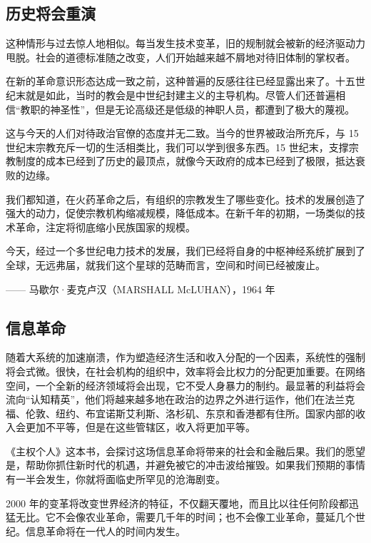 \subsection{历史将会重演}
这种情形与过去惊人地相似。每当发生技术变革，旧的规制就会被新的经济驱动力甩脱。社会的道德标准随之改变，人们开始越来越不屑地对待旧体制的掌权者。


在新的革命意识形态达成一致之前，这种普遍的反感往往已经显露出来了。十五世纪末就是如此，当时的教会是中世纪封建主义的主导机构。尽管人们还普遍相信“教职的神圣性”，但是无论高级还是低级的神职人员，都遭到了极大的蔑视。


这与今天的人们对待政治官僚的态度并无二致。当今的世界被政治所充斥，与 15 世纪末宗教充斥一切的生活相类比，我们可以学到很多东西。15 世纪末，支撑宗教制度的成本已经到了历史的最顶点，就像今天政府的成本已经到了极限，抵达衰败的边缘。


我们都知道，在火药革命之后，有组织的宗教发生了哪些变化。技术的发展创造了强大的动力，促使宗教机构缩减规模，降低成本。在新千年的初期，一场类似的技术革命，注定将彻底缩小民族国家的规模。



\begin{tcolorbox}
\kaishu 今天，经过一个多世纪电力技术的发展，我们已经将自身的中枢神经系统扩展到了全球，无远弗届，就我们这个星球的范畴而言，空间和时间已经被废止。
\begin{flushright}
—— 马歇尔·麦克卢汉（MARSHALL McLUHAN），1964 年
\end{flushright}
\end{tcolorbox}

\subsection{信息革命}
随着大系统的加速崩溃，作为塑造经济生活和收入分配的一个因素，系统性的强制将会式微。很快，在社会机构的组织中，效率将会比权力的分配更加重要。在网络空间，一个全新的经济领域将会出现，它不受人身暴力的制约。最显著的利益将会流向“认知精英”，他们将越来越多地在政治的边界之外进行运作，他们在法兰克福、伦敦、纽约、布宜诺斯艾利斯、洛杉矶、东京和香港都有住所。国家内部的收入会更加不平等，但是在这些管辖区，收入将更加平等。

《主权个人》这本书，会探讨这场信息革命将带来的社会和金融后果。我们的愿望是，帮助你抓住新时代的机遇，并避免被它的冲击波给摧毁。如果我们预期的事情有一半会发生，你就将面临史所罕见的沧海剧变。

2000 年的变革将改变世界经济的特征，不仅翻天覆地，而且比以往任何阶段都迅猛无比。它不会像农业革命，需要几千年的时间；也不会像工业革命，蔓延几个世纪。信息革命将在一代人的时间内发生。

